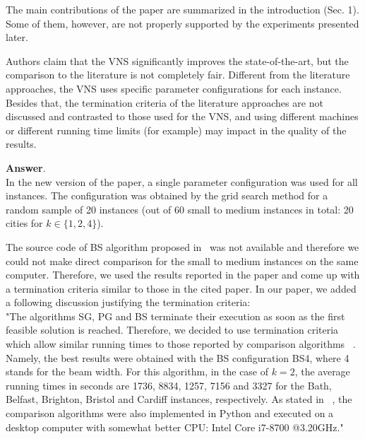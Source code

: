 \documentclass [11pt]{scrartcl}
\begin{document}
\begin{leftbar}
  
The main contributions of the paper are summarized in the introduction (Sec. 1). Some of them, however, are not properly supported by the experiments presented later.
\end{leftbar}
\begin{enumerate}
	\textbf{Answer}. \\
	In the new version of the paper, a single parameter configuration was used for all instances. The configuration was obtained by the grid search method for a random sample of 20 instances (out of 60 small to medium instances in total: 20 cities for $k \in \{1,2,4\}$).
	
	The source code of BS algorithm proposed in~\cite{corcoran2021heuristics} was not available and therefore we could not make direct comparison for the small to medium instances on the same computer. Therefore, we used the results reported in the paper and come up with a termination criteria similar to those in the cited paper. 
	In our paper, we added a following discussion justifying the termination criteria:\\
	"The algorithms SG, PG and BS terminate their execution as soon as the first feasible solution is reached. Therefore, we decided to use termination criteria which allow similar running times to those reported by comparison algorithms ~\cite{corcoran2021heuristics}. Namely, the best results were obtained with the BS configuration BS4, where 4 stands for the beam width. For this algorithm, in the case of $k=2$, the average running times in seconds are 1736, 8834, 1257, 7156 and 3327 for the Bath, Belfast, Brighton, Bristol and Cardiff instances, respectively. As stated in ~\cite{corcoran2021heuristics}, the comparison algorithms were also implemented in  Python and executed on a desktop computer with somewhat better CPU: Intel Core i7-8700 @3.20GHz."
	

\end{enumerate}
\end{document}
